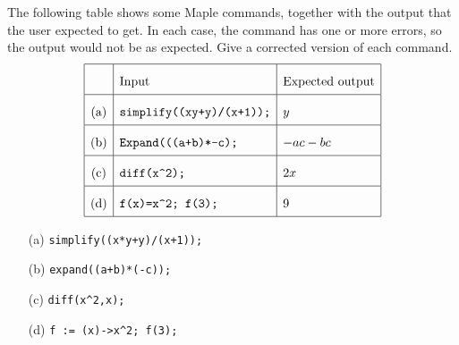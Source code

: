 \documentclass[a4paper]{article}
\begin{document}
\begin{problem}\label{ex-error-ii}
 The following table shows some Maple commands, together
 with the output that the user expected to get.  In each
 case, the command has one or more errors, so the output
 would not be as expected.  Give a corrected version of each
 command.  
 \[ \renewcommand{\arraystretch}{2}
    \begin{array}{|c|l|l|}
     \hline
      & \text{Input} & \text{Expected output} \\ \hline
      \text{(a)} &
      \verb~simplify((xy+y)/(x+1));~ &
      y \\ \hline
      \text{(b)} &
      \verb~Expand(((a+b)*-c);~ &
      -ac-bc \\ \hline
      \text{(c)} &
      \verb~diff(x^2);~ &
      2x \\ \hline
      \text{(d)} &
      \verb~f(x)=x^2; f(3);~ &
      9 \\ \hline
    \end{array}
 \]
\end{problem}
\begin{solution}
 \begin{itemize}
  \item[(a)] \verb~simplify((x*y+y)/(x+1));~ \hspace{2em}
  \item[(b)] \verb~expand((a+b)*(-c));~ \hspace{2em}
  \item[(c)] \verb~diff(x^2,x);~ \hspace{2em}
  \item[(d)] \verb~f := (x)->x^2; f(3);~ \hspace{2em}
 \end{itemize}
\end{solution}
\end{document}
